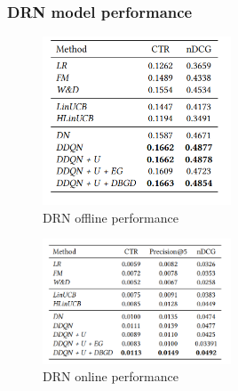 \documentclass{ieeetj}
\begin{document}
\subsubsection{DRN model performance}
\begin{figure}[h]
	\centering
	\includegraphics[width=0.5\textwidth]{figures/drn-offine-performance.png}
	\caption{DRN offline performance}
	\label{fig:drl-performance}
\end{figure}
\begin{figure}[h]
	\centering
	\includegraphics[width=0.5\textwidth]{figures/drn-online-performance.png}
	\caption{DRN online performance}
	\label{fig:drl-performance2}
\end{figure}
\end{document}
